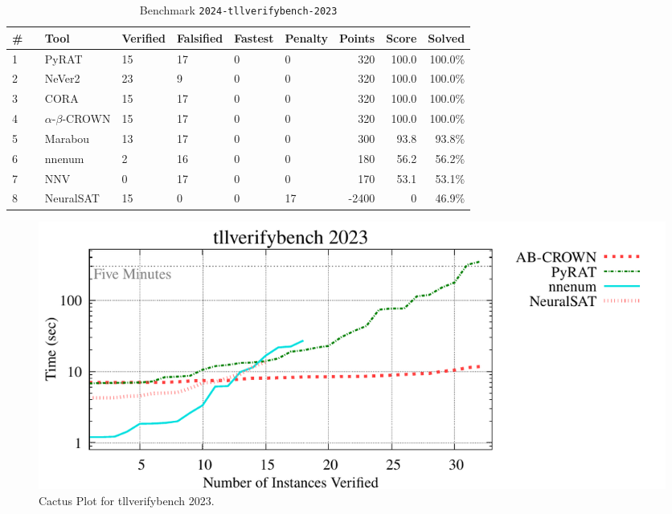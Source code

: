 \begin{table}[h]
\begin{center}
\caption{Benchmark \texttt{2024-tllverifybench-2023}} \label{tab:cat_{cat}}
{\setlength{\tabcolsep}{2pt}
\begin{tabular}[h]{@{}llllllrrr@{}}
\toprule
\textbf{\# ~} & \textbf{Tool} & \textbf{Verified} & \textbf{Falsified} & \textbf{Fastest} & \textbf{Penalty} & \textbf{Points} & \textbf{Score} & \textbf{Solved}\\
\midrule
1 & PyRAT & 15 & 17 & 0 & 0 & 320 & 100.0 & 100.0\% \\
2 & NeVer2 & 23 & 9 & 0 & 0 & 320 & 100.0 & 100.0\% \\
3 & CORA & 15 & 17 & 0 & 0 & 320 & 100.0 & 100.0\% \\
4 & $\alpha$-$\beta$-CROWN & 15 & 17 & 0 & 0 & 320 & 100.0 & 100.0\% \\
5 & Marabou & 13 & 17 & 0 & 0 & 300 & 93.8 & 93.8\% \\
6 & nnenum & 2 & 16 & 0 & 0 & 180 & 56.2 & 56.2\% \\
7 & NNV & 0 & 17 & 0 & 0 & 170 & 53.1 & 53.1\% \\
8 & NeuralSAT & 15 & 0 & 0 & 17 & -2400 & 0 & 46.9\% \\
\bottomrule
\end{tabular}
}
\end{center}
\end{table}



\begin{figure}[h]
\centerline{\includegraphics[width=\textwidth]{cactus/2024_tllverifybench_2023.pdf}}
\caption{Cactus Plot for tllverifybench 2023.}
\label{fig:quantPic}
\end{figure}

